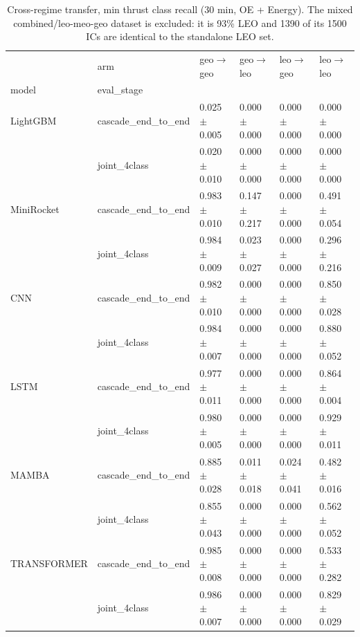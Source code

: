 \begin{table}
\centering
\caption{Cross-regime transfer, min thrust class recall (30 min, OE + Energy). The mixed combined/leo-meo-geo dataset is excluded: it is 93\% LEO and 1390 of its 1500 ICs are identical to the standalone LEO set.}
\label{tab:transfer_minrec}
\begin{tabular}{llllll}
\toprule
            & arm & geo$\rightarrow$geo & geo$\rightarrow$leo & leo$\rightarrow$geo & leo$\rightarrow$leo \\
model & eval_stage &                     &                     &                     &                     \\
\midrule
LightGBM & cascade_end_to_end &   0.025 $\pm$ 0.005 &   0.000 $\pm$ 0.000 &   0.000 $\pm$ 0.000 &   0.000 $\pm$ 0.000 \\
            & joint_4class &   0.020 $\pm$ 0.010 &   0.000 $\pm$ 0.000 &   0.000 $\pm$ 0.000 &   0.000 $\pm$ 0.000 \\
MiniRocket & cascade_end_to_end &   0.983 $\pm$ 0.010 &   0.147 $\pm$ 0.217 &   0.000 $\pm$ 0.000 &   0.491 $\pm$ 0.054 \\
            & joint_4class &   0.984 $\pm$ 0.009 &   0.023 $\pm$ 0.027 &   0.000 $\pm$ 0.000 &   0.296 $\pm$ 0.216 \\
CNN & cascade_end_to_end &   0.982 $\pm$ 0.010 &   0.000 $\pm$ 0.000 &   0.000 $\pm$ 0.000 &   0.850 $\pm$ 0.028 \\
            & joint_4class &   0.984 $\pm$ 0.007 &   0.000 $\pm$ 0.000 &   0.000 $\pm$ 0.000 &   0.880 $\pm$ 0.052 \\
LSTM & cascade_end_to_end &   0.977 $\pm$ 0.011 &   0.000 $\pm$ 0.000 &   0.000 $\pm$ 0.000 &   0.864 $\pm$ 0.004 \\
            & joint_4class &   0.980 $\pm$ 0.005 &   0.000 $\pm$ 0.000 &   0.000 $\pm$ 0.000 &   0.929 $\pm$ 0.011 \\
MAMBA & cascade_end_to_end &   0.885 $\pm$ 0.028 &   0.011 $\pm$ 0.018 &   0.024 $\pm$ 0.041 &   0.482 $\pm$ 0.016 \\
            & joint_4class &   0.855 $\pm$ 0.043 &   0.000 $\pm$ 0.000 &   0.000 $\pm$ 0.000 &   0.562 $\pm$ 0.052 \\
TRANSFORMER & cascade_end_to_end &   0.985 $\pm$ 0.008 &   0.000 $\pm$ 0.000 &   0.000 $\pm$ 0.000 &   0.533 $\pm$ 0.282 \\
            & joint_4class &   0.986 $\pm$ 0.007 &   0.000 $\pm$ 0.000 &   0.000 $\pm$ 0.000 &   0.829 $\pm$ 0.029 \\
\bottomrule
\end{tabular}
\end{table}
